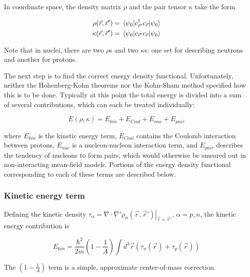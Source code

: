 In coordinate space, the density matrix $\rho$ and the pair tensor $\kappa$ take the form

\begin{align}
\rho(\vec{r},\vec{r}') &= \expval{c_{\vec{r}'}^\dagger c_{\vec{r}}}{\psi_0} \\
\kappa(\vec{r},\vec{r}') &= \expval{c_{\vec{r}'} c_{\vec{r}}}{\psi_0}
\end{align}

\noindent Note that in nuclei, there are two $\rho$s and two $\kappa$s: one set for describing neutrons and another for protons.

The next step is to find the correct energy density functional. Unfortunately, neither the Hohenberg-Kohn theorems nor the Kohn-Sham method specified how this is to be done. Typically at this point the total energy is divided into a sum of several contributions, which can each be treated individually:

\begin{equation}
E(\rho, \kappa) = E_{kin} + E_{Coul} + E_{nuc} + E_{pair}
\end{equation}

\noindent where $E_{kin}$ is the kinetic energy term, $E_{Coul}$ contains the Coulomb interaction between protons, $E_{nuc}$ is a nucleon-nucleon interaction term, and $E_{pair}$ describes the tendency of nucleons to form pairs, which would otherwise be smeared out in non-interacting mean-field models. Portions of the energy density functional corresponding to each of these terms are described below.

\subsubsection{Kinetic energy term}

Defining the kinetic density $\tau_\alpha = \left.\nabla\cdot\nabla'\rho_\alpha(\vec{r},\vec{r}')\right|_{\vec{r}=\vec{r}'}$, $\alpha=p,n$, the kinetic energy contribution is

\begin{equation}
E_{kin} = \frac{\hbar^2}{2m} \left(1-\frac{1}{A}\right) \int d^3\vec{r} \left(\tau_n(\vec{r}) + \tau_p(\vec{r}) \right)
\end{equation}

\noindent The $\left(1-\frac{1}{A}\right)$ term is a simple, approximate center-of-mass correction.


